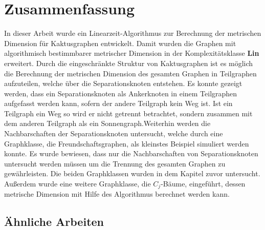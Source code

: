 \chapter{Zusammenfassung}
\vspace{-5mm}
In dieser Arbeit wurde ein Linearzeit-Algorithmus zur Berechnung der metrischen Dimension für Kaktusgraphen entwickelt. Damit wurden die Graphen mit algorithmisch bestimmbarer metrischer Dimension in der Komplexitätsklasse \textbf{Lin} erweitert.\vspace{-1.5mm}\newline\newline
Durch die eingeschränkte Struktur von Kaktusgraphen ist es möglich die Berechnung der metrischen Dimension des gesamten Graphen in Teilgraphen aufzuteilen, welche über die Separationsknoten entstehen. Es konnte gezeigt werden, dass ein Separationsknoten als Ankerknoten in einem Teilgraphen aufgefasst werden kann, sofern der andere Teilgraph kein Weg ist. Ist ein Teilgraph ein Weg so wird er nicht getrennt betrachtet, sondern zusammen mit dem anderen Teilgraph als ein Sonnengraph.\newline Weiterhin werden die Nachbarschaften der Separationsknoten untersucht, welche durch eine Graphklasse, die Freundschaftsgraphen, als kleinstes Beispiel simuliert werden konnte. Es wurde bewiesen, dass nur die Nachbarschaften von Separationsknoten untersucht werden müssen um die Trennung des gesamten Graphen zu gewährleisten. \vspace{-1.5mm}\newline\newline
Die beiden Graphklassen wurden in dem Kapitel zuvor untersucht. Außerdem wurde eine weitere Graphklasse, die $C_j$-Bäume, eingeführt, dessen metrische Dimension mit Hilfe des Algorithmus berechnet werden kann.
\vspace{-5mm}
\section{Ähnliche Arbeiten}
\vspace{-3mm}

